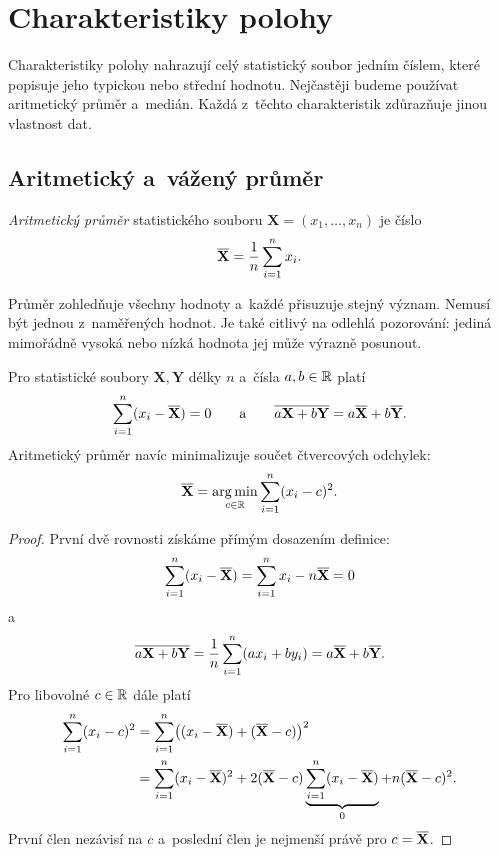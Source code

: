\section{Charakteristiky polohy}\label{sec:ai-charakteristiky-polohy}

Charakteristiky polohy nahrazují celý statistický soubor jedním číslem, které popisuje jeho typickou nebo střední hodnotu. Nejčastěji budeme používat aritmetický průměr a~medián. Každá z~těchto charakteristik zdůrazňuje jinou vlastnost dat.

\subsection{Aritmetický a~vážený průměr}

\begin{definition}\label{def:ai-prumer}
    \emph{Aritmetický průměr} statistického souboru
    \(\mathbf{X}=(x_1,\ldots,x_n)\) je číslo
    \[
        \overline{\mathbf{X}}
        =
        \frac{1}{n}\sum_{i=1}^{n}x_i.
    \]
\end{definition}

Průměr zohledňuje všechny hodnoty a~každé přisuzuje stejný význam. Nemusí být jednou z~naměřených hodnot. Je také citlivý na odlehlá pozorování: jediná mimořádně vysoká nebo nízká hodnota jej může výrazně posunout.

\begin{proposition}\label{prop:ai-prumer-vlastnosti}
    Pro statistické soubory \(\mathbf{X},\mathbf{Y}\) délky \(n\) a~čísla \(a,b\in\mathbb{R}\) platí
    \[
        \sum_{i=1}^{n}(x_i-\overline{\mathbf{X}})=0
        \qquad\text{a}\qquad
        \overline{a\mathbf{X}+b\mathbf{Y}}
        =
        a\overline{\mathbf{X}}+b\overline{\mathbf{Y}}.
    \]
    Aritmetický průměr navíc minimalizuje součet čtvercových odchylek:
    \[
        \overline{\mathbf{X}}
        =
        \operatorname*{arg\,min}_{c\in\mathbb{R}}
        \sum_{i=1}^{n}(x_i-c)^2.
    \]
\end{proposition}

\begin{proof}
    První dvě rovnosti získáme přímým dosazením definice:
    \[
        \sum_{i=1}^{n}(x_i-\overline{\mathbf{X}})
        =
        \sum_{i=1}^{n}x_i-n\overline{\mathbf{X}}
        =
        0
    \]
    a
    \[
        \overline{a\mathbf{X}+b\mathbf{Y}}
        =
        \frac1n\sum_{i=1}^{n}(ax_i+by_i)
        =
        a\overline{\mathbf{X}}+b\overline{\mathbf{Y}}.
    \]
    Pro libovolné \(c\in\mathbb{R}\) dále platí
    \begin{align*}
        \sum_{i=1}^{n}(x_i-c)^2
        &=
        \sum_{i=1}^{n}
        \bigl((x_i-\overline{\mathbf{X}})
        +(\overline{\mathbf{X}}-c)\bigr)^2\\
        &=
        \sum_{i=1}^{n}(x_i-\overline{\mathbf{X}})^2
        +2(\overline{\mathbf{X}}-c)
        \underbrace{\sum_{i=1}^{n}(x_i-\overline{\mathbf{X}})}_{0}
        +n(\overline{\mathbf{X}}-c)^2.
    \end{align*}
    První člen nezávisí na \(c\) a~poslední člen je nejmenší právě pro
    \(c=\overline{\mathbf{X}}\).
\end{proof}

